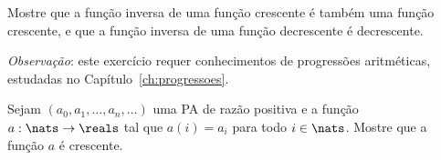 \begin{exercise}
\label{exer:inversa-funcao-crescente}
Mostre que a função inversa de uma função crescente é também uma
função crescente, e que a função inversa de uma função decrescente é
decrescente.
\end{exercise}

\begin{exercise}
\textit{Observação}: este exercício requer conhecimentos de progressões
aritméticas, estudadas no Capítulo~\ref{ch:progressoes}.

  Sejam $(a_0,a_1, \dots,a_n,\dots)$ uma PA de razão positiva e a função 
  $a : \nats \to \reals$ tal que $a(i)=a_i$ para todo $i\in\nats$.
  Mostre que a função $a$ é crescente.
\end{exercise}